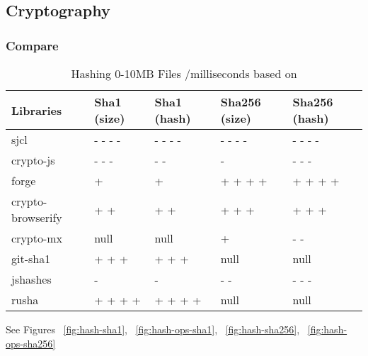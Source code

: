 
\subsection{Cryptography}

\subsubsection{Compare}

\begin{table}[!h]
\centering
\caption{Hashing 0-10MB Files /milliseconds based on \cite {Tarr2014PerformanceLibraries.}}
\label{hashing-0-10mb-files}
\begin{adjustbox}{center, width=\columnwidth-20pt}
\begin{tabular}{|l|l|l|l|l|}
\hline
Libraries & Sha1 (size) & Sha1 (hash) & Sha256 (size) & Sha256 (hash)	\\ \hline
sjcl				& - - -	-	& - - - -	& - - - -	& - - -	-	\\ \hline
crypto-js			& - - -		& - -		& -			& - - -		\\ \hline
forge				& +			& +			& + + +	+	& + + + +	\\ \hline
crypto-browserify	& + +		& + +		& + + +		& +	+ +		\\ \hline
crypto-mx           & null		& null		& +			& -	-		\\ \hline
git-sha1            & + + +		& + + +		& null		& null		\\ \hline
jshashes            & -			& -			& - -		& - - -		\\ \hline
rusha               & + + + +	& + + + +	& null		& null		\\ \hline
\end{tabular}
\end{adjustbox}
See Figures ~\ref{fig:hash-sha1}, ~\ref{fig:hash-ops-sha1}, ~\ref{fig:hash-sha256}, ~\ref{fig:hash-ops-sha256}
\end{table}

